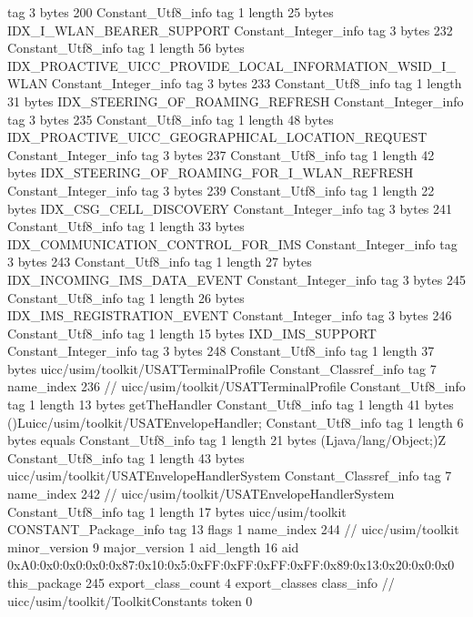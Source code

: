 {{{			tag	3
			bytes	200
		}
		Constant_Utf8_info {
			tag	1
			length	25
			bytes	IDX_I_WLAN_BEARER_SUPPORT
		}
		Constant_Integer_info {
			tag	3
			bytes	232
		}
		Constant_Utf8_info {
			tag	1
			length	56
			bytes	IDX_PROACTIVE_UICC_PROVIDE_LOCAL_INFORMATION_WSID_I_WLAN
		}
		Constant_Integer_info {
			tag	3
			bytes	233
		}
		Constant_Utf8_info {
			tag	1
			length	31
			bytes	IDX_STEERING_OF_ROAMING_REFRESH
		}
		Constant_Integer_info {
			tag	3
			bytes	235
		}
		Constant_Utf8_info {
			tag	1
			length	48
			bytes	IDX_PROACTIVE_UICC_GEOGRAPHICAL_LOCATION_REQUEST
		}
		Constant_Integer_info {
			tag	3
			bytes	237
		}
		Constant_Utf8_info {
			tag	1
			length	42
			bytes	IDX_STEERING_OF_ROAMING_FOR_I_WLAN_REFRESH
		}
		Constant_Integer_info {
			tag	3
			bytes	239
		}
		Constant_Utf8_info {
			tag	1
			length	22
			bytes	IDX_CSG_CELL_DISCOVERY
		}
		Constant_Integer_info {
			tag	3
			bytes	241
		}
		Constant_Utf8_info {
			tag	1
			length	33
			bytes	IDX_COMMUNICATION_CONTROL_FOR_IMS
		}
		Constant_Integer_info {
			tag	3
			bytes	243
		}
		Constant_Utf8_info {
			tag	1
			length	27
			bytes	IDX_INCOMING_IMS_DATA_EVENT
		}
		Constant_Integer_info {
			tag	3
			bytes	245
		}
		Constant_Utf8_info {
			tag	1
			length	26
			bytes	IDX_IMS_REGISTRATION_EVENT
		}
		Constant_Integer_info {
			tag	3
			bytes	246
		}
		Constant_Utf8_info {
			tag	1
			length	15
			bytes	IXD_IMS_SUPPORT
		}
		Constant_Integer_info {
			tag	3
			bytes	248
		}
		Constant_Utf8_info {
			tag	1
			length	37
			bytes	uicc/usim/toolkit/USATTerminalProfile
		}
		Constant_Classref_info {
			tag	7
			name_index	236		// uicc/usim/toolkit/USATTerminalProfile
		}
		Constant_Utf8_info {
			tag	1
			length	13
			bytes	getTheHandler
		}
		Constant_Utf8_info {
			tag	1
			length	41
			bytes	()Luicc/usim/toolkit/USATEnvelopeHandler;
		}
		Constant_Utf8_info {
			tag	1
			length	6
			bytes	equals
		}
		Constant_Utf8_info {
			tag	1
			length	21
			bytes	(Ljava/lang/Object;)Z
		}
		Constant_Utf8_info {
			tag	1
			length	43
			bytes	uicc/usim/toolkit/USATEnvelopeHandlerSystem
		}
		Constant_Classref_info {
			tag	7
			name_index	242		// uicc/usim/toolkit/USATEnvelopeHandlerSystem
		}
		Constant_Utf8_info {
			tag	1
			length	17
			bytes	uicc/usim/toolkit
		}
		CONSTANT_Package_info {
			tag	13
			flags	1
			name_index	244		// uicc/usim/toolkit
			minor_version	9
			major_version	1
			aid_length	16
			aid	0xA0:0x0:0x0:0x0:0x87:0x10:0x5:0xFF:0xFF:0xFF:0xFF:0x89:0x13:0x20:0x0:0x0
		}
	}
	this_package	245
	export_class_count	4
	export_classes {
		class_info {		// uicc/usim/toolkit/ToolkitConstants
			token	0
}}}
